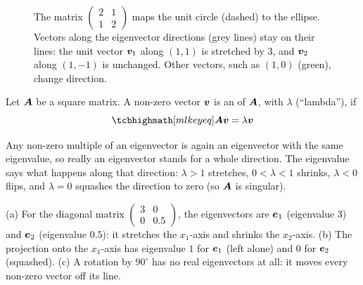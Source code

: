 \begin{figure}[htbp]
\centering
{}
\caption{The matrix $\left(\begin{smallmatrix} 2 & 1\\ 1 &
  2\end{smallmatrix}\right)$ maps the unit circle (dashed) to the ellipse.
  Vectors along the eigenvector directions (grey lines) stay on their lines:
  the unit vector $\bm{v}_1$ along $(1,1)$ is stretched by $3$, and $\bm{v}_2$ along
  $(1,-1)$ is unchanged. Other vectors, such as $(1, 0)$ (green), change
  direction.}
\label{fig:eigenvectors}
\end{figure}

\begin{definition}\label{def:eigen}
Let $\bm{A}$ be a square matrix. A non-zero vector $\bm{v}$ is an
 of $\bm{A}$, with  $\lambda$ (``lambda''), if
\[
  \keyeq{\mA\vv = \lambda\vv}
\]
\end{definition}

Any non-zero multiple of an eigenvector is again an eigenvector with the same
eigenvalue, so really an eigenvector stands for a whole direction. The
eigenvalue says what happens along that direction: $\lambda > 1$ stretches,
$0 < \lambda < 1$ shrinks, $\lambda < 0$ flips, and $\lambda = 0$ squashes the
direction to zero (so $\bm{A}$ is singular).

\begin{example}
(a) For the diagonal matrix $\left(\begin{smallmatrix} 3 & 0\\ 0 &
0.5\end{smallmatrix}\right)$, the eigenvectors are $\bm{e}_1$ (eigenvalue $3$) and
$\bm{e}_2$ (eigenvalue $0.5$): it stretches the $x_1$-axis and shrinks the
$x_2$-axis.
(b) The projection onto the $x_1$-axis has eigenvalue $1$ for $\bm{e}_1$ (left
alone) and $0$ for $\bm{e}_2$ (squashed).
(c) A rotation by $90^\circ$ has no real eigenvectors at all: it moves every
non-zero vector off its line.
\end{example}

